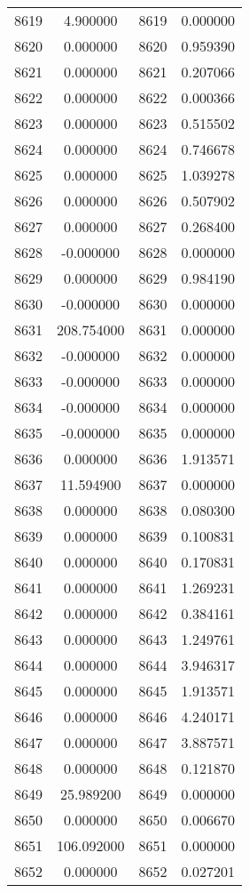 \documentclass[12pt]{article}
\begin{document}
\begin{longtable}{@{}cccc@{}}
8619 & 4.900000 & 8619 & 0.000000 \\
8620 & 0.000000 & 8620 & 0.959390 \\
8621 & 0.000000 & 8621 & 0.207066 \\
8622 & 0.000000 & 8622 & 0.000366 \\
8623 & 0.000000 & 8623 & 0.515502 \\
8624 & 0.000000 & 8624 & 0.746678 \\
8625 & 0.000000 & 8625 & 1.039278 \\
8626 & 0.000000 & 8626 & 0.507902 \\
8627 & 0.000000 & 8627 & 0.268400 \\
8628 & -0.000000 & 8628 & 0.000000 \\
8629 & 0.000000 & 8629 & 0.984190 \\
8630 & -0.000000 & 8630 & 0.000000 \\
8631 & 208.754000 & 8631 & 0.000000 \\
8632 & -0.000000 & 8632 & 0.000000 \\
8633 & -0.000000 & 8633 & 0.000000 \\
8634 & -0.000000 & 8634 & 0.000000 \\
8635 & -0.000000 & 8635 & 0.000000 \\
8636 & 0.000000 & 8636 & 1.913571 \\
8637 & 11.594900 & 8637 & 0.000000 \\
8638 & 0.000000 & 8638 & 0.080300 \\
8639 & 0.000000 & 8639 & 0.100831 \\
8640 & 0.000000 & 8640 & 0.170831 \\
8641 & 0.000000 & 8641 & 1.269231 \\
8642 & 0.000000 & 8642 & 0.384161 \\
8643 & 0.000000 & 8643 & 1.249761 \\
8644 & 0.000000 & 8644 & 3.946317 \\
8645 & 0.000000 & 8645 & 1.913571 \\
8646 & 0.000000 & 8646 & 4.240171 \\
8647 & 0.000000 & 8647 & 3.887571 \\
8648 & 0.000000 & 8648 & 0.121870 \\
8649 & 25.989200 & 8649 & 0.000000 \\
8650 & 0.000000 & 8650 & 0.006670 \\
8651 & 106.092000 & 8651 & 0.000000 \\
8652 & 0.000000 & 8652 & 0.027201 \\

\end{longtable}
\end{document}
